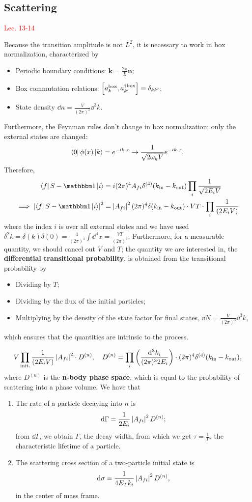 \documentclass{article}
\begin{document}
\subsection{Scattering}
\textcolor{red}{Lec. 13-14}

Because the transition amplitude is not $L^2$, it is necessary to work in box normalization, characterized by
\begin{itemize}
    \item Periodic boundary conditions: $\mathbf k=\frac{2\pi}L\mathbf n$;
    \item Box commutation relations: $\comm{a^\text{box}_k}{a^{\dag\text{box}}_{k'}}=\delta_{kk'}$;
    \item State density $\dd n=\frac V{(2\pi)^3}\dd^3k$.
\end{itemize}
Furthermore, the Feynman rules don't change in box normalization; only the external states are changed:
$$\bra 0\phi(x)\ket k=e^{-ik\cdot x}\to \frac 1{\sqrt{2\omega_kV}}e^{-ik\cdot x}.$$
Therefore, 
\begin{align*}
    \bra fS-\mathbbm 1\ket i&=i(2\pi)^4A_{fi}\delta^{(4)}(k_\text{in}-k_\text{out})\prod_i\frac 1{\sqrt{2E_iV}}\\
    \implies \abs{\bra fS-\mathbbm 1\ket i}^2&=\abs{A_{fi}}^2(2\pi)^4\delta(k_\text{in}-k_\text{out})\cdot VT\cdot\prod_i\frac 1{(2E_iV)}
\end{align*}
where the index $i$ is over all external states and we have used $\delta^2k=\delta(k)\delta(0)=\frac 1{(2\pi)^4}\int \dd^4x=\frac{VT}{(2\pi)^4}$. Furthermore, for a measurable quantity, we should cancel out $V$ and $T$; the quantity we are interested in, the \textbf{differential transitional probability}, is obtained from the transitional probability by
\begin{itemize}
    \item Dividing by $T$; 
    \item Dividing by the flux of the initial particles;
    \item Multiplying by the density of the state factor for final states, $\dd N=\frac V{(2\pi)^3}\dd^3k$,
\end{itemize}
which ensures that the quantities are intrinsic to the process.

\begin{equation}
    V\prod_\text{init.}\frac 1{(2E_iV)}\left\lvert A_{fi}\right\rvert^2\cdot D^{(n)},\quad D^{(n)}=\prod_i\left(\frac{\dd^3k_i}{(2\pi)^32E_i}\right)\cdot(2\pi)^4\delta^{(4)}(k_\text{in}-k_\text{out}),
\end{equation}
where $D^{(n)}$ is the \textbf{n-body phase space}, which is equal to the probability of scattering into a phase volume. We have that 
\begin{enumerate}
    \item The rate of a particle decaying into $n$ is 
    $$\dd\Gamma=\frac 1{2E_i}\left\lvert A_{fi}\right\rvert^2D^{(n)};$$
    from $\dd\Gamma$, we obtain $\Gamma$, the decay width, from which we get $\tau=\frac 1\Gamma$, the characteristic lifetime of a particle. 
    \item The scattering cross section of a two-particle initial state is 
    $$\dd\sigma=\frac 1{4E_Tk_i}\left\lvert A_{fi}\right\rvert^2D^{(n)},$$
    in the center of mass frame.
\end{enumerate}
\end{document}
